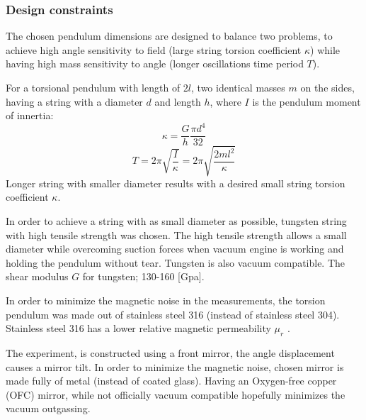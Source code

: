 \documentclass[\main/master.tex]{subfiles}
\begin{document}
\subsubsection{Design constraints}
\par\noindent
The chosen pendulum dimensions are designed to balance two problems, to achieve high angle sensitivity to field (large string torsion coefficient $\kappa$) while having high mass sensitivity to angle (longer oscillations time period $T$). 
\par\noindent
For a torsional pendulum with length of $2l$, two identical masses $m$ on the sides, having a string with a diameter $d$ and length $h$, where $I$ is the pendulum moment of innertia:
\begin{equation}
\kappa = \frac{G}{h} \frac{\pi d^4}{32}    \label{eqn:torsion_coefficient}
\end{equation}
\begin{equation}
T = 2\pi\sqrt{\frac{I}{\kappa}}= 2\pi\sqrt{\frac{2ml^2}{\kappa}}   \label{eqn:undamped_motion_equation}
\end{equation}
Longer string with smaller diameter results with a desired small string torsion coefficient $\kappa$. 
\par\noindent
In order to achieve a string with as small diameter as possible, tungsten string with high tensile strength was chosen. The high tensile strength allows a small diameter while overcoming suction forces when vacuum engine is working and holding the pendulum without tear. Tungsten is also vacuum compatible. The shear modulus $G$ for tungsten; 130-160 [Gpa]\cite{tungsten}.
\par\noindent
In order to minimize the magnetic noise in the measurements, the torsion pendulum was made out of stainless steel 316 (instead of stainless steel 304). Stainless steel 316 has a lower relative magnetic permeability $\mu_r$ \cite{SS316}.
\par\noindent
The experiment, is constructed using a front mirror, the angle displacement causes a mirror tilt. In order to minimize the magnetic noise, chosen mirror is made fully of metal (instead of coated glass). Having an Oxygen-free copper (OFC) mirror, while not officially vacuum compatible hopefully minimizes the vacuum outgassing.
\end{document}
